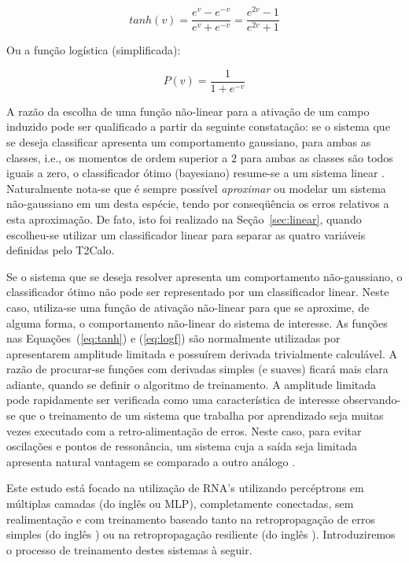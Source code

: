\begin{equation}
tanh(v) = \frac{e^v - e^{-v}}{e^v + e^{-v}} = \frac{e^{2v} - 1}{e^{2v} + 1}
\label{eq:tanh}
\end{equation}

Ou a função logística (simplificada):

\begin{equation}
P(v) = \frac{1}{1 + e^{-v}}
\label{eq:logf}
\end{equation}

A razão da escolha de uma função não-linear para a ativação de um campo
induzido pode ser qualificado a partir da seguinte constatação: se o sistema
que se deseja classificar apresenta um comportamento gaussiano, para ambas as
classes, i.e., os momentos de ordem superior a $2$ para ambas as classes são
todos iguais a zero, o classificador ótimo (bayesiano) resume-se a um sistema
linear \cite{haykin}. Naturalmente nota-se que é sempre possível
\textit{aproximar} ou modelar um sistema não-gaussiano em um desta espécie,
tendo por conseqüência os erros relativos a esta aproximação. De fato, isto
foi realizado na Seção~\ref{sec:linear}, quando escolheu-se utilizar um
classificador linear para separar as quatro variáveis definidas pelo T2Calo.

Se o sistema que se deseja resolver apresenta um comportamento não-gaussiano,
o classificador ótimo não pode ser representado por um classificador
linear. Neste caso, utiliza-se uma função de ativação não-linear para que se
aproxime, de alguma forma, o comportamento não-linear do sistema de interesse.
As funções nas Equações~(\ref{eq:tanh}) e (\ref{eq:logf}) são normalmente
utilizadas por apresentarem amplitude limitada e possuírem derivada
trivialmente calculável. A razão de procurar-se funções com derivadas simples
(e suaves) ficará mais clara adiante, quando se definir o algoritmo de
treinamento. A amplitude limitada pode rapidamente ser verificada como uma
característica de interesse observando-se que o treinamento de um sistema que
trabalha por aprendizado seja muitas vezes executado com a retro-alimentação
de erros. Neste caso, para evitar oscilações e pontos de ressonância, um
sistema cuja a saída seja limitada apresenta natural vantagem se comparado a
outro análogo \cite{haykin}.

Este estudo está focado na utilização de RNA's utilizando percéptrons em
múltiplas camadas (do inglês  ou MLP),
completamente conectadas, sem realimentação e com treinamento baseado tanto na
retropropagação de erros simples (do inglês ) ou na
retropropagação resiliente (do inglês ). Introduziremos o processo de treinamento destes sistemas à
seguir.

